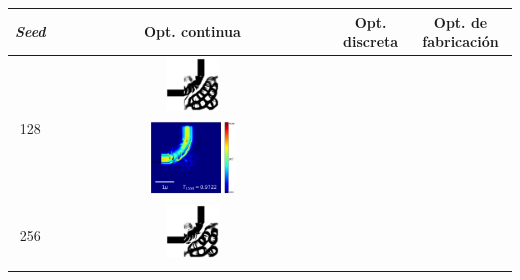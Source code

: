 \begin{table}[ht]
    \centering
    \vspace*{-2.5cm}
    \hspace*{-3cm}
    \begin{tabular}{|c|c|c|c|}
    \hline 
    \emph{Seed} & Opt. continua & Opt. discreta &  Opt. de fabricación \\
    \hline
      \multirow{2}{*}{128} &
      \includegraphics[width=0.20\textwidth]{image/results/bend/GA/visualize_eps_cont_128.png} \\
      \cline{2-4}
      &
      \includegraphics[width=0.33\textwidth]{image/results/bend/GA/visualize_field_cont_128.png} \\
    \hline
      \multirow{2}{*}{256} &
      \includegraphics[width=0.20\textwidth]{image/results/bend/GA/visualize_eps_cont_256.png} \\
      \cline{2-4}
      &

\end{tabular}
\end{table}
